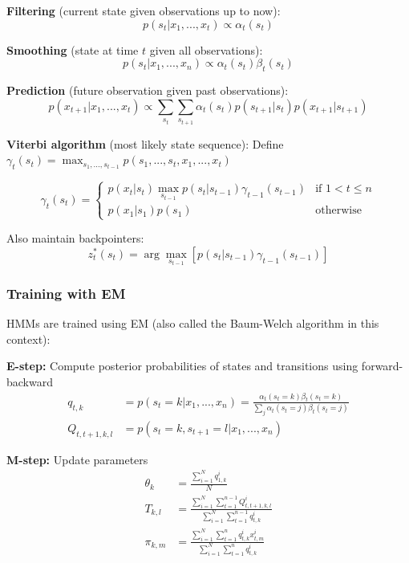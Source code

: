 \documentclass{article}
\begin{document}
\textbf{Filtering} (current state given observations up to now):
\begin{equation}
    p(s_t|x_1,...,x_t) \propto \alpha_t(s_t)
\end{equation}

\textbf{Smoothing} (state at time $t$ given all observations):
\begin{equation}
    p(s_t|x_1,...,x_n) \propto \alpha_t(s_t)\beta_t(s_t)
\end{equation}

\textbf{Prediction} (future observation given past observations):
\begin{equation}
    p(x_{t+1}|x_1,...,x_t) \propto \sum_{s_t}\sum_{s_{t+1}} \alpha_t(s_t)p(s_{t+1}|s_t)p(x_{t+1}|s_{t+1})
\end{equation}

\textbf{Viterbi algorithm} (most likely state sequence):
Define $\gamma_t(s_t) = \max_{s_1,...,s_{t-1}} p(s_1,...,s_t,x_1,...,x_t)$

\begin{equation}
    \gamma_t(s_t) = 
    \begin{cases}
        p(x_t|s_t) \max_{s_{t-1}} p(s_t|s_{t-1})\gamma_{t-1}(s_{t-1}) & \text{if } 1 < t \leq n \\
        p(x_1|s_1)p(s_1) & \text{otherwise}
    \end{cases}
\end{equation}

Also maintain backpointers:
\begin{equation}
    z^*_t(s_t) = \arg\max_{s_{t-1}}[p(s_t|s_{t-1})\gamma_{t-1}(s_{t-1})]
\end{equation}

\subsubsection{Training with EM}
HMMs are trained using EM (also called the Baum-Welch algorithm in this context):

\textbf{E-step:} Compute posterior probabilities of states and transitions using forward-backward
\begin{align}
    q_{t,k} &= p(s_t = k|x_1,...,x_n) = \frac{\alpha_t(s_t=k)\beta_t(s_t=k)}{\sum_j \alpha_t(s_t=j)\beta_t(s_t=j)} \\
    Q_{t,t+1,k,l} &= p(s_t = k, s_{t+1} = l|x_1,...,x_n)
\end{align}

\textbf{M-step:} Update parameters
\begin{align}
    \theta_k &= \frac{\sum_{i=1}^N q^i_{1,k}}{N} \\
    T_{k,l} &= \frac{\sum_{i=1}^N\sum_{t=1}^{n-1} Q^i_{t,t+1,k,l}}{\sum_{i=1}^N\sum_{t=1}^{n-1} q^i_{t,k}} \\
    \pi_{k,m} &= \frac{\sum_{i=1}^N\sum_{t=1}^n q^i_{t,k}x^i_{t,m}}{\sum_{i=1}^N\sum_{t=1}^n q^i_{t,k}}
\end{align}
\end{document}
